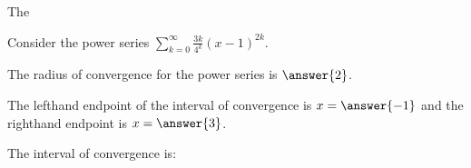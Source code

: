 The\documentclass{ximera}
\author{Jim Talamo}
\begin{document}
\begin{exercise}
Consider the power series $\sum_{k=0}^{\infty} \frac{3k}{4^k}(x-1)^{2k}$.

The radius of convergence for the power series is $\answer{2}$.

The lefthand endpoint of the interval of convergence is $x=\answer{-1}$ and the righthand endpoint is $x= \answer{3}$.

\begin{exercise}
The interval of convergence is:
\begin{multipleChoice}
\choice{$(-1,3]$}
\choice{$[-1,3)$}
\choice{$[-1,3]$}
\end{multipleChoice}

\end{exercise}
\end{exercise}
\end{document}

